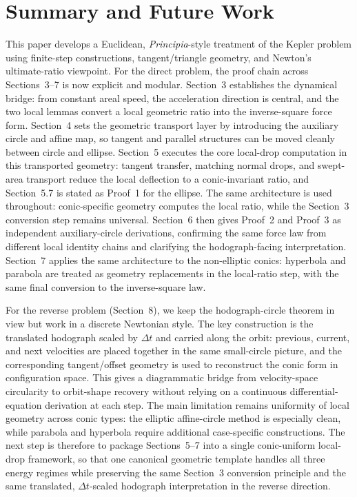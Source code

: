 \section{Summary and Future Work}

This paper develops a Euclidean, \emph{Principia}-style treatment of the Kepler problem using finite-step constructions, tangent/triangle geometry, and Newton's ultimate-ratio viewpoint. For the direct problem, the proof chain across Sections~3--7 is now explicit and modular. Section~3 establishes the dynamical bridge: from constant areal speed, the acceleration direction is central, and the two local lemmas convert a local geometric ratio into the inverse-square force form. Section~4 sets the geometric transport layer by introducing the auxiliary circle and affine map, so tangent and parallel structures can be moved cleanly between circle and ellipse. Section~5 executes the core local-drop computation in this transported geometry: tangent transfer, matching normal drops, and swept-area transport reduce the local deflection to a conic-invariant ratio, and Section~5.7 is stated as Proof~1 for the ellipse. The same architecture is used throughout: conic-specific geometry computes the local ratio, while the Section~3 conversion step remains universal. Section~6 then gives Proof~2 and Proof~3 as independent auxiliary-circle derivations, confirming the same force law from different local identity chains and clarifying the hodograph-facing interpretation. Section~7 applies the same architecture to the non-elliptic conics: hyperbola and parabola are treated as geometry replacements in the local-ratio step, with the same final conversion to the inverse-square law.

For the reverse problem (Section~8), we keep the hodograph-circle theorem in view but work in a discrete Newtonian style. The key construction is the translated hodograph scaled by $\Delta t$ and carried along the orbit: previous, current, and next velocities are placed together in the same small-circle picture, and the corresponding tangent/offset geometry is used to reconstruct the conic form in configuration space. This gives a diagrammatic bridge from velocity-space circularity to orbit-shape recovery without relying on a continuous differential-equation derivation at each step. The main limitation remains uniformity of local geometry across conic types: the elliptic affine-circle method is especially clean, while parabola and hyperbola require additional case-specific constructions. The next step is therefore to package Sections~5--7 into a single conic-uniform local-drop framework, so that one canonical geometric template handles all three energy regimes while preserving the same Section~3 conversion principle and the same translated, $\Delta t$-scaled hodograph interpretation in the reverse direction.
